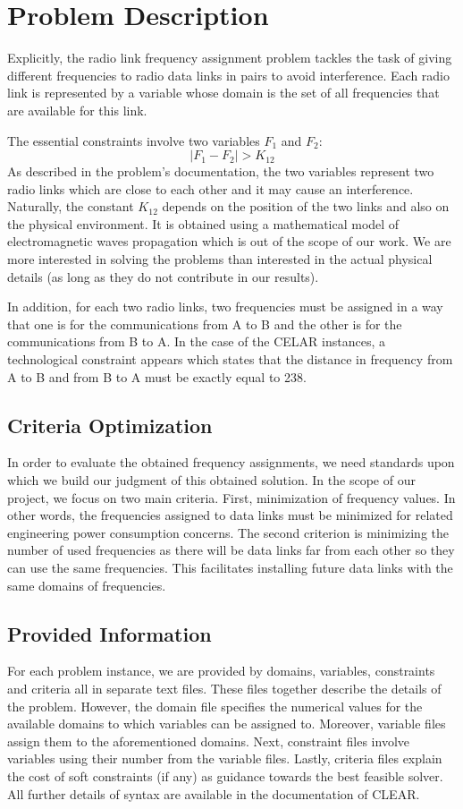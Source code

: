 \documentclass{article}
\begin{document}
	\section{Problem Description}
	Explicitly, the radio link frequency assignment problem tackles the task of giving different frequencies to radio data links in pairs to avoid interference. Each radio link is represented by a variable whose domain is the set of all frequencies that are available for this link. 
	
	The essential constraints involve two variables $F_1$ and $F_2$:\[|F_1 - F_2| > K_{12}\] 
	As described in the problem's documentation, the two variables represent two radio links which are close to each other and it may cause an interference. Naturally, the constant $K_{12}$ depends on the position of the two links and also on the physical environment. It is obtained using a mathematical model of electromagnetic waves propagation which is out of the scope of our work. We are more interested in solving the problems than interested in the actual physical details (as long as they do not contribute in our results).
	
	In addition, for each two radio links, two frequencies must be assigned in a way that one is for the communications from A to B and the other is for the communications from B to A. In the case of the CELAR instances, a technological constraint appears which states that the distance in frequency from A to B and from B to A must be exactly equal to 238.
	
	\subsection{Criteria Optimization}
	\label{criteria}
	In order to evaluate the obtained frequency assignments, we need standards upon which we build our judgment of this obtained solution. In the scope of our project, we focus on two main criteria. First, minimization of frequency values. In other words, the frequencies assigned to data links must be minimized for related engineering power consumption concerns. The second criterion is minimizing the number of used frequencies as there will be data links far from each other so they can use the same frequencies. This facilitates installing future data links with the same domains of frequencies.
	
	\subsection{Provided Information}
	For each problem instance, we are provided by domains, variables, constraints and criteria all in separate text files. These files together describe the details of the problem. However, the domain file specifies the numerical values for the available domains to which variables can be assigned to. Moreover, variable files assign them to the aforementioned domains. Next, constraint files involve variables using their number from the variable files. Lastly, criteria files explain the cost of soft constraints (if any) as guidance towards the best feasible solver. All further details of syntax are available in the documentation of CLEAR.
	
\end{document}

